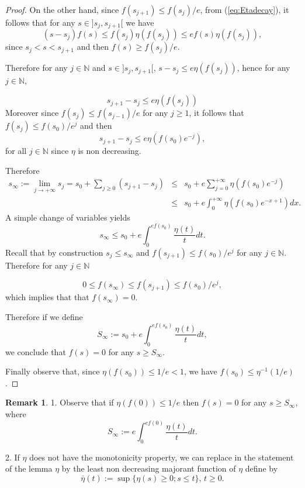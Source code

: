 \documentclass[12pt]{amsart}
\theoremstyle{definition}
\newtheorem{remark}[theorem]{Remark}
\numberwithin{theorem}{section}
\numberwithin{equation}{section}
\newcommand{\N}{\mathbb{N}}
\begin{document}
{\begin{proof}
On the other hand, since $f (s_{j + 1} )\leq f (s_j) \slash e$, from (\ref{eq:Etadecay}), it follows that for any $s \in ]s_j , s_{j +1}[$ we have
$$
 (s - s_j) f (s) \leq f (s_{j}) \eta (f (s_{j})) \leq  e f (s)  \eta (f (s_{j})),
$$
since $ s_j < s < s_{j+1}$ and then $f (s) \geq f (s_{j}) \slash e$.

Therefore for any $j \in \N$ and $s \in ]s_j, s_{j + 1}[$, $ s-s_j \leq e  \eta (f (s_{j}))$, hence for any $j \in \N$,

$$
s_{j + 1} - s_j \leq e  \eta (f (s_{j}))
$$
Moreover since $f (s_{j} )\leq f (s_{j-1}) \slash e$ for any $j\geq 1$, it follows that 
$f (s_{j } )\leq f (s_0) \slash e^j$ and then 
$$
s_{j + 1} - s_j \leq  e {\eta} (f (s_0)  e^{-j}),
$$
for all $j \in \N$ since $\eta$ is non decreasing.

Therefore
\begin{eqnarray*}
s_{\infty} := \lim_{j \to + \infty} s_j = s_0 + \sum_{j \geq 0} (s_{j + 1} - s_j) & \leq & s_0 + e \sum_{j =0}^{+ \infty} \eta (f (s_0)  e^{-j}) \\
&\leq & s_0 +  e \int_0^{+\infty} {\eta} \left(f (s_0)  e^{- x+ 1}\right)  d x.
\end{eqnarray*}
 A simple change of variables yields
 $$
 s_{\infty} \leq s_0 + e \int_0^{e f (s_0)} \frac{\eta (t)}{t} d t.
 $$ 
 Recall that by construction  $s_j \leq s_{\infty}$ and $f (s_{j + 1} )\leq f (s_0) \slash e^j$  for any $j \in \N$. Therefore for any $j \in \N$

$$ 
0 \leq f (s_{\infty})  \leq f (s_{j + 1} )\leq f (s_0) \slash e^j,
$$ 
which implies that  that $f (s_{\infty}) = 0$. 

Therefore if we define
$$
S_{\infty} := s_0 + e \int_0^{e f (s_0)}  \frac{\eta (t)}{t} d t,
$$
 we conclude that $f (s) = 0$ for any $s \geq S_{\infty}$.
 
 Finally observe that, since  $\eta (f (s_0)) \leq 1\slash e < 1$, we have $f (s_0) \leq \eta^{-1} (1\slash e)$.
 \end{proof}


\begin{remark} 1. Observe that if $ \eta (f (0)) \leq 1 \slash e$ then $ f (s) = 0$ for any $s \geq  S_{\infty}$, where
$$
S_{\infty} := e \int_0^{e f (0)}  \frac{\eta (t)}{t} d t.
$$

2. If $\eta$ does not have the monotonicity property, we can replace in the statement of the lemma $\eta$ by the least non decreasing majorant function of $\eta$ define by
$$
\bar{\eta} (t) := \sup \{\eta (s) \geq  0 ; s \leq t\} , \, t \geq 0.
$$
\end{remark}

}
\end{document}

